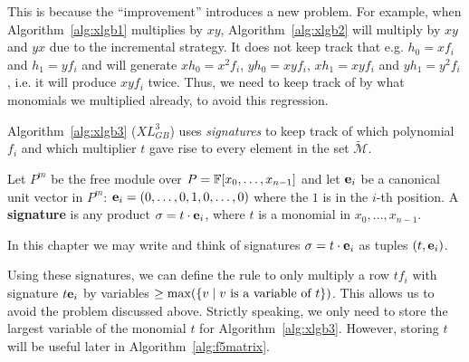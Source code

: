 This is because the ``improvement'' introduces a new problem. For example, when Algorithm~\ref{alg:xlgb1} multiplies by $xy$, Algorithm~\ref{alg:xlgb2} will multiply by $xy$ and $yx$ due to the incremental strategy. It does not keep track that e.g. $h_0 = xf_i$ and $h_1 = yf_i$ and will generate $xh_0 = x^2f_i$, $yh_0 = xyf_i$, $xh_1 = xyf_i$ and $yh_1 = y^2f_i$, i.e. it will produce $xyf_i$ twice. Thus, we need to keep track of by what monomials we multiplied already, to avoid this regression.

Algorithm~\ref{alg:xlgb3} ($XL_{GB}^3$) uses \emph{signatures} to keep track of which polynomial $f_i$ and which multiplier $t$ gave rise to every element in the set $\tilde{\mathcal{M}}$.

\begin{definition}[Signature]
\label{def:signature}
Let $P^m$ be the free module over $P  = \mathbb{F}[x_0,\dots,x_{n-1}]$ and let $\mathbf{e}_i$ be a canonical unit vector in $P^m$:  $\mathbf{e}_i = (0,\dots,0,1,0,\dots,0)$ where the $1$ is in the $i$-th position. A \textbf{signature} is any product $\sigma = t \cdot \mathbf{e}_i$, where $t$ is a monomial in $x_0,\ldots,x_{n-1}$.
\end{definition}

In this chapter we may write and think of signatures $\sigma = t \cdot \mathbf{e}_i$ as tuples $(t,\mathbf{e}_i)$.

Using these signatures, we can define the rule to only multiply a row $tf_i$ with signature $t\mathbf{e}_i$ by variables $\geq \max(\{v \mid v \textnormal{ is a variable of }t\})$. This allows us to avoid the problem discussed above. Strictly speaking, we only need to store the largest variable of the monomial $t$ for Algorithm~\ref{alg:xlgb3}. However, storing $t$ will be useful later in Algorithm~\ref{alg:f5matrix}.

\begin{algorithm}

\caption{$XL_{GB}^3$\label{alg:xlgb3}} 
\end{algorithm}

